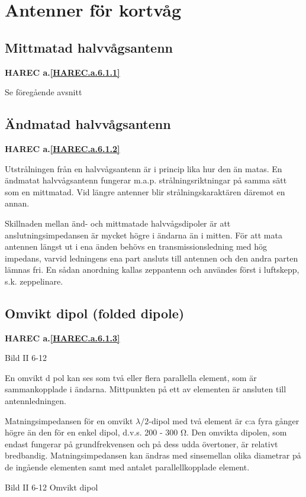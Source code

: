 \section{Antenner för kortvåg}

\subsection{Mittmatad halvvågsantenn}
\textbf{
HAREC a.\ref{HAREC.a.6.1.1}\label{myHAREC.a.6.1.1}
}

Se föregående avsnitt

\subsection{Ändmatad halvvågsantenn}
\textbf{
HAREC a.\ref{HAREC.a.6.1.2}\label{myHAREC.a.6.1.2}
}

Utstrålningen från en halvvågsantenn är i princip lika hur den än
matas. En ändmatat halvvågsantenn fungerar m.a.p. strålningsriktningar
på samma sätt som en mittmatad. Vid längre antenner blir
strålningskaraktären däremot en annan.

Skillnaden mellan änd- och mittmatade halvvågsdipoler är att
anslutningsimpedansen är mycket högre i ändarna än i mitten. För att
mata antennen längst ut i ena änden behövs en transmissionsledning med
hög impedans, varvid ledningens ena part ansluts till antennen och den
andra parten lämnas fri. En sådan anordning kallas zeppantenn och
användes först i luftskepp, s.k. zeppelinare.

\subsection{Omvikt dipol (folded dipole)}
\textbf{
HAREC a.\ref{HAREC.a.6.1.3}\label{myHAREC.a.6.1.3}
}

Bild II 6-12

En omvikt d pol kan ses som två eller flera parallella element, som är
sammankopplade i ändarna. Mittpunkten på ett av elementen är ansluten
till antennledningen.

Matningsimpedansen för en omvikt \(\lambda/2\)-dipol med två element är
c:a fyra gånger högre än den för en enkel dipol, d.v.s. 200 - 300
Ω. Den omvikta dipolen, som endast fungerar på grundfrekvensen och på
dess udda övertoner, är relativt bredbandig. Matningsimpedansen kan
ändras med sinsemellan olika diametrar på de ingående elementen samt
med antalet parallellkopplade element.

Bild II 6-12 Omvikt dipol

